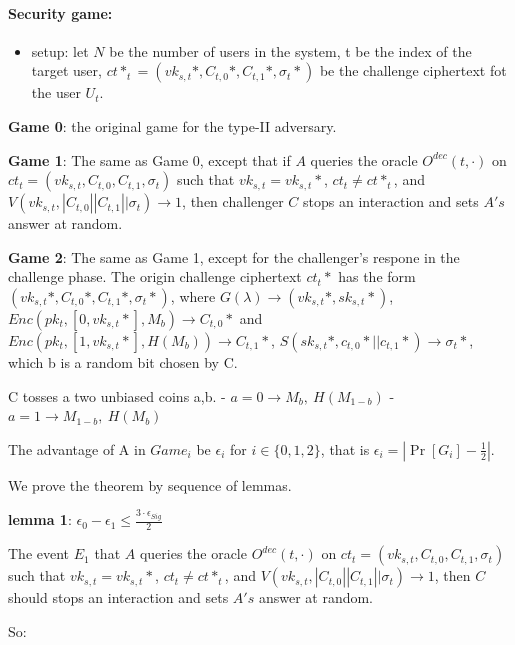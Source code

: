\documentclass[
]{article}
\providecommand{\tightlist}{%
  \setlength{\itemsep}{0pt}\setlength{\parskip}{0pt}}
\begin{document}
\hypertarget{security-game}{%
\paragraph{Security game:}\label{security-game}}

\begin{itemize}
\tightlist
\item
  setup: let \(N\) be the number of users in the system, t be the index
  of the target user,
  \(ct*_t = (vk_{s,t}*,C_{t,0}*,C_{t,1}*,\sigma_t*)\) be the challenge
  ciphertext fot the user \(U_t\).
\end{itemize}

\textbf{Game 0}: the original game for the type-II adversary.

\textbf{Game 1}: The same as Game 0, except that if \(A\) queries the
oracle \(O^{dec}(t,\cdot)\) on
\(ct_t=(vk_{s,t},C_{t,0},C_{t,1},\sigma_t)\) such that
\(vk_{s,t} = vk_{s,t}*\), \(ct_t \neq ct*_t\), and
\(V(vk_{s,t},|C_{t,0}||C_{t,1}||\sigma_t)\rightarrow 1\), then
challenger \(C\) stops an interaction and sets \(A's\) answer at random.

\textbf{Game 2}: The same as Game 1, except for the challenger's respone
in the challenge phase. The origin challenge ciphertext \(ct_t*\) has
the form \((vk_{s,t}*, C_{t,0}*, C_{t,1}*, \sigma_t*)\), where
\(G(\lambda)\rightarrow ({vk}_{s,t}*, {sk}_{s,t}*)\),
\(Enc(pk_t, [0,{vk}_{s,t}*],M_b)\rightarrow C_{t,0}*\) and
\(Enc(pk_t, [1,{vk}_{s,t}*],H(M_b))\rightarrow C_{t,1}*\),
\(S({sk}_{s,t}*, c_{t,0}*||c_{t,1}*)\rightarrow \sigma_t*\), which b is
a random bit chosen by C.

C tosses a two unbiased coins a,b. -
\(a= 0 \rightarrow M_b, \ H(M_{1-b})\) -
\(a= 1 \rightarrow M_{1-b}, \ H(M_b)\)

The advantage of A in \(Game_i\) be \(\epsilon_i\) for
\(i \in \{0,1,2\}\), that is \(\epsilon_i = |\Pr[G_i]-\frac{1}{2}|\).

We prove the theorem by sequence of lemmas.

\textbf{lemma 1}:
\(\epsilon_0 - \epsilon_1 \leq \frac{3\cdot \epsilon_{Sig}}{2}\)

The event \(E_1\) that \(A\) queries the oracle \(O^{dec}(t,\cdot)\) on
\(ct_t=(vk_{s,t},C_{t,0},C_{t,1},\sigma_t)\) such that
\(vk_{s,t} = vk_{s,t}*\), \(ct_t \neq ct*_t\), and
\(V(vk_{s,t},|C_{t,0}||C_{t,1}||\sigma_t)\rightarrow 1\), then \(C\)
should stops an interaction and sets \(A's\) answer at random.

So:
\end{document}
